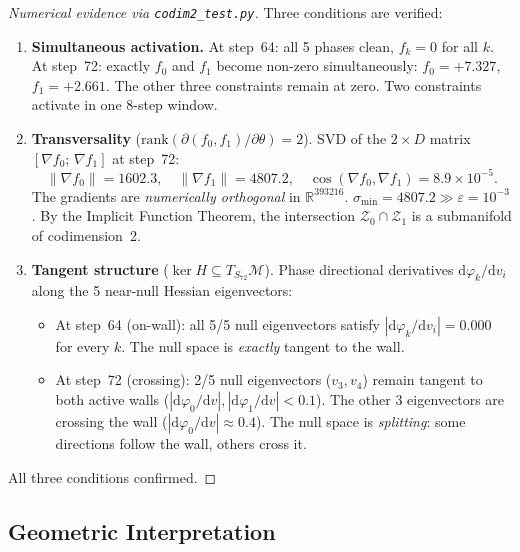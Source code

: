 \documentclass[11pt]{amsart}
\begin{document}
\begin{proof}[Numerical evidence via \texttt{codim2\_test.py}]
Three conditions are verified:
\begin{enumerate}
\item \textbf{Simultaneous activation.}
  At step~64: all 5 phases clean, $f_k = 0$ for all $k$.
  At step~72: exactly $f_0$ and $f_1$ become non-zero simultaneously:
  $f_0 = +7.327$, $f_1 = +2.661$.
  The other three constraints remain at zero.
  Two constraints activate in one 8-step window.

\item \textbf{Transversality} ($\mathrm{rank}(\partial(f_0,f_1)/\partial\theta) = 2$).
  SVD of the $2 \times D$ matrix $[\nabla f_0;\, \nabla f_1]$ at step~72:
  \[
    \|\nabla f_0\| = 1602.3, \quad
    \|\nabla f_1\| = 4807.2, \quad
    \cos(\nabla f_0, \nabla f_1) = 8.9 \times 10^{-5}.
  \]
  The gradients are \emph{numerically orthogonal} in $\mathbb{R}^{393216}$.
  $\sigma_\mathrm{min} = 4807.2 \gg \varepsilon = 10^{-3}$.
  By the Implicit Function Theorem, the intersection
  $\mathcal{Z}_0 \cap \mathcal{Z}_1$ is a submanifold of codimension~2.

\item \textbf{Tangent structure} ($\ker H \subseteq T_{S_{72}}\mathcal{M}$).
  Phase directional derivatives $\mathrm{d}\varphi_k/\mathrm{d}v_i$
  along the 5 near-null Hessian eigenvectors:
  \begin{itemize}
  \item At step~64 (on-wall): all 5/5 null eigenvectors satisfy
    $|\mathrm{d}\varphi_k/\mathrm{d}v_i| = 0.000$ for every $k$.
    The null space is \emph{exactly} tangent to the wall.
  \item At step~72 (crossing): 2/5 null eigenvectors ($v_3, v_4$)
    remain tangent to both active walls ($|\mathrm{d}\varphi_0/\mathrm{d}v|,
    |\mathrm{d}\varphi_1/\mathrm{d}v| < 0.1$).
    The other 3 eigenvectors are crossing the wall
    ($|\mathrm{d}\varphi_0/\mathrm{d}v| \approx 0.4$).
    The null space is \emph{splitting}: some directions follow the wall,
    others cross it.
  \end{itemize}
\end{enumerate}
All three conditions confirmed.
\end{proof}

\subsection{Geometric Interpretation}
\end{document}
